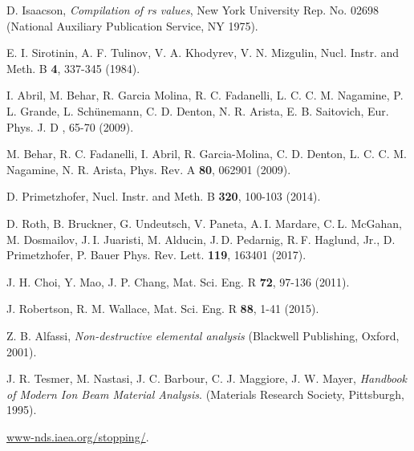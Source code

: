 \begin{thebibliography}{9}
D. Isaacson,
\textit{Compilation of rs values}, New York University Rep. No. 02698
(National Auxiliary Publication Service, NY 1975).


E. I. Sirotinin, A. F. Tulinov, V. A. Khodyrev, V. N. Mizgulin, 
Nucl. Instr. and Meth. B \textbf{4}, 337-345 (1984).

I. Abril, M. Behar, R. Garcia Molina, R. C. Fadanelli, L. C. C. M. Nagamine, 
P. L. Grande, L. Sch\"unemann, C. D. Denton, N. R. Arista, E. B. Saitovich,
Eur. Phys. J. D , 65-70 (2009).

M. Behar, R. C. Fadanelli, I. Abril, R. Garcia-Molina, C. D. Denton, 
L. C. C. M. Nagamine, N. R. Arista, 
Phys. Rev. A \textbf{80},  062901 (2009).

D. Primetzhofer, 
Nucl. Instr. and Meth. B \textbf{320}, 100-103 (2014).

D. Roth, B. Bruckner, G. Undeutsch, V. Paneta, A. I. Mardare, 
C. L. McGahan, M. Dosmailov, J. I. Juaristi, M. Alducin, 
J. D. Pedarnig, R. F. Haglund, Jr., D. Primetzhofer, P. Bauer
Phys. Rev. Lett. \textbf{119}, 163401 (2017).

J. H. Choi, Y. Mao, J. P. Chang, 
Mat. Sci. Eng. R \textbf{72}, 97-136 (2011).

J. Robertson, R. M. Wallace, 
Mat. Sci. Eng. R \textbf{88}, 1-41 (2015).

Z. B. Alfassi,
\textit{Non-destructive elemental analysis}
(Blackwell Publishing, Oxford, 2001).

J. R. Tesmer, M. Nastasi, J. C. Barbour, C. J. Maggiore, J. W. Mayer,
\textit{Handbook of Modern Ion Beam Material Analysis}.
(Materials Research Society, Pittsburgh, 1995).

\href{https://www-nds.iaea.org/stopping/}{www-nds.iaea.org/stopping/}.


\end{thebibliography}
